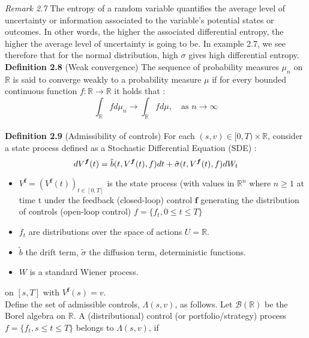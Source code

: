 \documentclass[oneside, a4paper, onecolumn, 11pt]{article}
\begin{document}
\textit{Remark 2.7}
The entropy of a random variable quantifies the average level of uncertainty or information associated to the variable's potential states or outcomes. In other words, the higher the associated differential entropy, the higher the average  level of uncertainty is going to be. In example 2.7, we see therefore that for the normal distribution, high $\sigma$ gives high differential entropy. 
\\
\textbf{Definition 2.8} (Weak convergence) \cite{Achim2006}
The sequence of probability measures $\mu_n$ on $\mathbb{R}$ is said to converge weakly to a probability measure $\mu$ if for every bounded continuous function $f:\mathbb{R} \to \mathbb{R}$ it holds that :
\begin{equation*}
    \int_{\mathbb{R}} f d\mu_n \to \int_{\mathbb{R}} f d\mu,  \quad \text{as $n \to \infty$}  
\end{equation*}
\\
\textbf{Definition 2.9} (Admissibility of controls) \cite{WangZhou2020}
For each \((s, v) \in [0, T) \times \mathbb{R}\), consider a state process defined as a Stochastic Differential Equation (SDE) : 
\begin{equation}
dV^{\boldsymbol{f}}(t) = \Tilde{b}(t, V^{\boldsymbol{f}}(t), f)dt + \Tilde{\sigma}(t, V^{\boldsymbol{f}}(t), f)dW_t   \label{SDE:basic_def}
\end{equation}
\begin{itemize}
    \item $V^{\boldsymbol{f}}=\left( V^{\boldsymbol{f}}(t)\right)_{t\in [0,T]}$ is the state process (with values in $\mathbb{R}^n$ where $n\geq 1$ at time t under the feedback  (closed-loop) control $\boldsymbol{f}$ generating the distribution of controls (open-loop control) $f= \{f_t, 0\leq t \leq T\}$
    \item $f_t$ are distributions over the space of actions $U = \mathbb{R}$. 
    \item $\tilde{b}$ the drift term, $\tilde{\sigma}$ the diffusion term, deterministic functions.
    \item $W$ is a standard Wiener process.
\end{itemize}
on \([s, T]\) with $V^{\boldsymbol{f}}(s) = v$. 
\\Define the set of admissible controls, \(\Lambda(s, v)\), as follows. Let \(\mathcal{B}(\mathbb{R})\) be the Borel algebra on \(\mathbb{R}\). A (distributional) control (or portfolio/strategy) process \(f= \{f_t, s \leq t \leq T\}\) belongs to \(\Lambda(s, v)\), if
\end{document}
